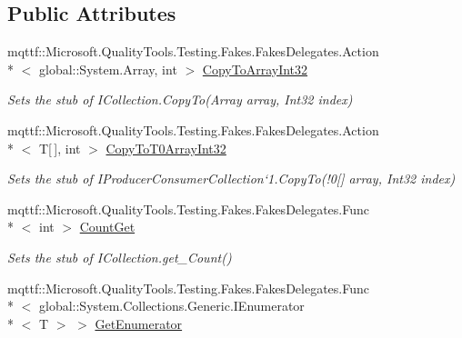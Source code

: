 \subsection*{Public Attributes}
\begin{DoxyCompactItemize}
\item 
mqttf\-::\-Microsoft.\-Quality\-Tools.\-Testing.\-Fakes.\-Fakes\-Delegates.\-Action\\*
$<$ global\-::\-System.\-Array, int $>$ \hyperlink{class_system_1_1_collections_1_1_concurrent_1_1_fakes_1_1_stub_i_producer_consumer_collection_3_01_t_01_4_a38428d6a597c23254642e1002f603867}{Copy\-To\-Array\-Int32}
\begin{DoxyCompactList}\small\item\em Sets the stub of I\-Collection.\-Copy\-To(\-Array array, Int32 index)\end{DoxyCompactList}\item 
mqttf\-::\-Microsoft.\-Quality\-Tools.\-Testing.\-Fakes.\-Fakes\-Delegates.\-Action\\*
$<$ T\mbox{[}$\,$\mbox{]}, int $>$ \hyperlink{class_system_1_1_collections_1_1_concurrent_1_1_fakes_1_1_stub_i_producer_consumer_collection_3_01_t_01_4_a74ee71ca818e3a9667b19fdeba6380bf}{Copy\-To\-T0\-Array\-Int32}
\begin{DoxyCompactList}\small\item\em Sets the stub of I\-Producer\-Consumer\-Collection`1.Copy\-To(!0\mbox{[}\mbox{]} array, Int32 index)\end{DoxyCompactList}\item 
mqttf\-::\-Microsoft.\-Quality\-Tools.\-Testing.\-Fakes.\-Fakes\-Delegates.\-Func\\*
$<$ int $>$ \hyperlink{class_system_1_1_collections_1_1_concurrent_1_1_fakes_1_1_stub_i_producer_consumer_collection_3_01_t_01_4_af7753362601c95efce5ea9a1d22d521d}{Count\-Get}
\begin{DoxyCompactList}\small\item\em Sets the stub of I\-Collection.\-get\-\_\-\-Count()\end{DoxyCompactList}\item 
mqttf\-::\-Microsoft.\-Quality\-Tools.\-Testing.\-Fakes.\-Fakes\-Delegates.\-Func\\*
$<$ global\-::\-System.\-Collections.\-Generic.\-I\-Enumerator\\*
$<$ T $>$ $>$ \hyperlink{class_system_1_1_collections_1_1_concurrent_1_1_fakes_1_1_stub_i_producer_consumer_collection_3_01_t_01_4_aa39b3ed5fc7a650187c74f059a362136}{Get\-Enumerator}

\end{DoxyCompactItemize}
